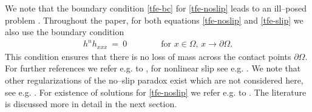 \documentclass[pagesize,pdftex]{amsart}
\newcommand{\p}{\partial}
\newcommand{\Ome}{\Omega}
\begin{document}
We note that the boundary condition \eqref{tfe-bc} for \eqref{tfe-noslip} leads
to an ill--posed problem \cite{EggersFontelos-2025}. Throughout the paper, for
both equations \eqref{tfe-noslip} and \eqref{tfe-slip} we also use the boundary
condition
\begin{align} \label{no-massflux} %
  h^n h_{xxx} \ = \ 0 \qquad\qquad \text{for $x \in \Ome$, $x \to \p \Ome$.}
\end{align}
This condition ensures that there is no loss of mass across the contact points
$\p \Ome$. For further references we refer e.g. to
\cite{BDQ-Book,HuhScriven-1971,Hocking-1983,EggersStone-2004}, for nonlinear
slip see e.g. \cite{ThompsonTroian-1997}. We note that other regularizations of
the no--slip paradox exist which are not considered here, see
e.g. \cite{OronDavisBankoff-1997,WitelskiBernoff-1999,OronBankoff-2001,BowenKing-2001}. For
existence of solutions for \eqref{tfe-noslip} we refer e.g. to
\cite{BertozziPugh-1994,BerettaBertschDalpasso-1995,BertschDalpassoGarckeGruen-1998,DalpassoGarckeGruen-1998,Gruen-2004-1,GiacomelliKnuepferOtto-2008,GnannWisse-2022,GnannWisse-2025}. The
literature is discussed more in detail in the next section.


\medskip
\end{document}
